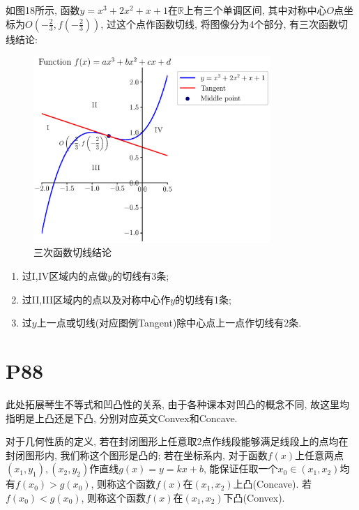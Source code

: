 \documentclass{book}
\begin{document}
    如图18所示, 函数$y=x^3+2x^2+x+1$在$\mathbb{R}$上有三个单调区间, 其中对称中心$O$点坐标为$\displaystyle O\left ( -\frac{2}{3},f\left ( -\frac{2}{3} \right )  \right ) $, 过这个点作函数切线, 将图像分为4个部分, 有三次函数切线结论:

    \begin{figure}[htbp]
        \centering
        \includegraphics[width=0.8\textwidth]{img/CubicFunction.eps}
        \caption{三次函数切线结论}
    \end{figure}

    \begin{enumerate}
        \item 过I,IV区域内的点做$y$的切线有3条;
        \item 过II,III区域内的点以及对称中心作$y$的切线有1条;
        \item 过$y$上一点或切线(对应图例Tangent)除中心点上一点作切线有2条.
    \end{enumerate}

    \section{\textcolor[rgb]{0.11,0.65,0.52}{P88}}

    此处拓展\textcolor[rgb]{0.38,0.11,0.2}{琴生不等式}和\textcolor[rgb]{0.38,0.11,0.2}{凹凸性}的关系, 由于各种课本对凹凸的概念不同, 故这里均指明是上凸还是下凸, 分别对应英文Convex和Concave.

    对于几何性质的定义, 若在封闭图形上任意取2点作线段能够满足线段上的点均在封闭图形内, 我们称这个图形是凸的; 若在坐标系内, 对于函数$f(x)$上任意两点$(x_1,y_1),(x_2,y_2)$作直线$g(x)=y=kx+b$, 能保证任取一个$x_0\in \left( x_1,x_2 \right)$均有$f(x_0)>g(x_0)$, 则称这个函数$f(x)$在$\left( x_1,x_2 \right)$上凸(Concave). 若$f(x_0)<g(x_0)$, 则称这个函数$f(x)$在$\left( x_1,x_2 \right)$下凸(Convex).
    
\end{document}
